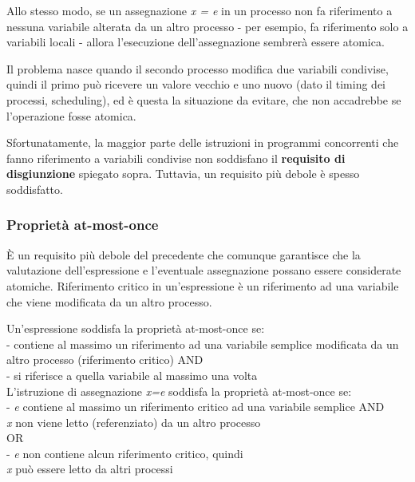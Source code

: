 \documentclass[10pt,a4paper]{article}
\begin{document}
Allo stesso modo, se un assegnazione \textit{x = e} in un processo non fa riferimento a nessuna variabile alterata da un altro processo - per esempio, fa riferimento solo a variabili locali - allora l'esecuzione dell'assegnazione sembrerà essere atomica.

Il problema nasce quando il secondo processo modifica due variabili condivise, quindi il primo può ricevere  un valore vecchio e uno nuovo (dato il timing dei processi, scheduling), ed è questa la situazione da evitare, che non accadrebbe se l'operazione fosse atomica.

Sfortunatamente, la maggior parte delle istruzioni in programmi concorrenti che fanno riferimento a
variabili condivise non soddisfano il \textbf{requisito di disgiunzione} spiegato sopra. 
Tuttavia, un requisito più debole è spesso soddisfatto.

\subsubsection{Proprietà at-most-once}
\`{E} un requisito più debole del precedente che comunque garantisce che la valutazione dell'espressione e l'eventuale assegnazione possano essere considerate atomiche.
Riferimento critico in un'espressione è un riferimento ad una variabile che viene modificata da un altro processo.

Un'espressione soddisfa la proprietà at-most-once se:\\
- contiene al massimo un riferimento ad una variabile semplice modificata da un altro processo (riferimento critico) AND\\
- si riferisce a quella variabile al massimo una volta\\

L'istruzione di assegnazione \textit{x=e} soddisfa la proprietà at-most-once se:\\
- \textit{e} contiene al massimo un riferimento critico ad una variabile semplice AND\\
\textit{x} non viene letto (referenziato) da un altro processo\\
OR\\
- \textit{e} non contiene alcun riferimento critico, quindi \\
\textit{x} può essere letto da altri processi\\
\end{document}
